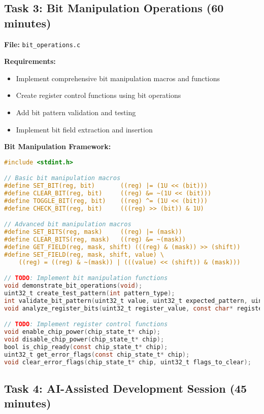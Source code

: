 \documentclass[11pt,a4paper]{article}
\begin{document}
\subsection{Task 3: Bit Manipulation Operations (60 minutes)}

\textbf{File:} \texttt{bit\_operations.c}

\textbf{Requirements:}
\begin{itemize}
    \item Implement comprehensive bit manipulation macros and functions
    \item Create register control functions using bit operations
    \item Add bit pattern validation and testing
    \item Implement bit field extraction and insertion
\end{itemize}

\textbf{Bit Manipulation Framework:}
\begin{lstlisting}[language=C]
#include <stdint.h>

// Basic bit manipulation macros
#define SET_BIT(reg, bit)       ((reg) |= (1U << (bit)))
#define CLEAR_BIT(reg, bit)     ((reg) &= ~(1U << (bit)))
#define TOGGLE_BIT(reg, bit)    ((reg) ^= (1U << (bit)))
#define CHECK_BIT(reg, bit)     (((reg) >> (bit)) & 1U)

// Advanced bit manipulation macros
#define SET_BITS(reg, mask)     ((reg) |= (mask))
#define CLEAR_BITS(reg, mask)   ((reg) &= ~(mask))
#define GET_FIELD(reg, mask, shift) (((reg) & (mask)) >> (shift))
#define SET_FIELD(reg, mask, shift, value) \
    ((reg) = ((reg) & ~(mask)) | (((value) << (shift)) & (mask)))

// TODO: Implement bit manipulation functions
void demonstrate_bit_operations(void);
uint32_t create_test_pattern(int pattern_type);
int validate_bit_pattern(uint32_t value, uint32_t expected_pattern, uint32_t mask);
void analyze_register_bits(uint32_t register_value, const char* register_name);

// TODO: Implement register control functions
void enable_chip_power(chip_state_t* chip);
void disable_chip_power(chip_state_t* chip);
bool is_chip_ready(const chip_state_t* chip);
uint32_t get_error_flags(const chip_state_t* chip);
void clear_error_flags(chip_state_t* chip, uint32_t flags_to_clear);
\end{lstlisting}

\subsection{Task 4: AI-Assisted Development Session (45 minutes)}
\end{document}

